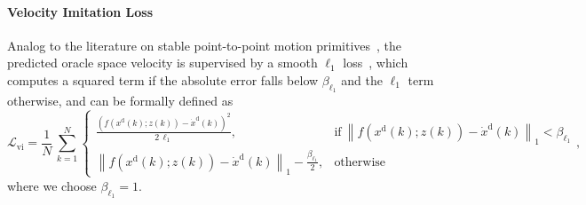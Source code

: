 \paragraph{Velocity Imitation Loss}
Analog to the literature on stable point-to-point motion primitives~\citep{rana2020euclideanizing}, the predicted oracle space velocity is supervised by a smooth $\ell_1$ loss~\citep{girshick2015fast}, which computes a squared term if the absolute error falls below $\beta_{\ell_1}$ and the $\ell_1$ term otherwise, and can be formally defined as
\begin{equation}
    \mathcal{L}_\mathrm{vi} = \frac{1}{N} \, \sum_{k = 1}^{N} \begin{cases}
		\frac{\left ( f(x^\mathrm{d}(k);z(k)) - \dot{x}^\mathrm{d}(k) \right )^2}{2 \, \ell_1}, & \text{if} \: \left \lVert f(x^\mathrm{d}(k);z(k)) - \dot{x}^\mathrm{d}(k) \right \rVert_1 < \beta_{\ell_1} \\
        \left \lVert f(x^\mathrm{d}(k);z(k)) - \dot{x}^\mathrm{d}(k) \right \rVert_1 - \frac{\beta_{\ell_1}}{2} , & \text{otherwise}
    \end{cases},
\end{equation}
where we choose $\beta_{\ell_1} = 1$.

